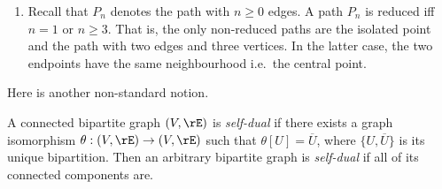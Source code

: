 \documentclass{article}
\begin{document}
\begin{example}
\begin{enumerate}[1.]
  \item
  Recall that $P_n$ denotes the path with $n \geq 0$ edges. A path $P_n$ is reduced iff $n = 1$ or $n \geq 3$. That is, the only non-reduced paths are the isolated point and the path with two edges and three vertices. In the latter case, the two endpoints have the same neighbourhood i.e.\ the central point. \endbox
  
  
  \end{enumerate}
  \end{example}

Here is another non-standard notion.

\begin{definition}
  \item
  A connected bipartite graph $(V,\rE)$ is \emph{self-dual} if there exists a graph isomorphism $\theta  :(V,\rE) \to (V,\rE)$ such that $\theta[U] = \overline{U}$, where $\{U,\overline{U}\}$ is its unique bipartition. Then an arbitrary bipartite graph is \emph{self-dual} if all of its connected components are. \endbox
\end{definition}
  
\end{document}
